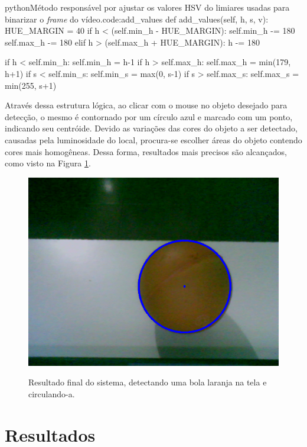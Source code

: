 \begin{figure}[H]
\end{figure}

\begin{code}{python}{Método responsável por ajustar os valores HSV do limiares usadas para binarizar o \textit{frame} do vídeo.}{code:add_values}
def add_values(self, h, s, v):
	HUE_MARGIN = 40
	if h < (self.min_h - HUE_MARGIN):
		self.min_h -= 180
		self.max_h -= 180
	elif h > (self.max_h + HUE_MARGIN):
        h -= 180

	if h < self.min_h:
		self.min_h = h-1
	if h > self.max_h:
		self.max_h = min(179, h+1)
	if s < self.min_s:
		self.min_s = max(0, s-1)
	if s > self.max_s:
		self.max_s = min(255, s+1)
\end{code}

Através dessa estrutura lógica, ao clicar com o mouse no objeto desejado para detecção, o mesmo é contornado por um círculo azul e marcado com um ponto, indicando seu centróide. Devido as variações das cores do objeto a ser detectado, causadas pela luminosidade do local, procura-se escolher áreas do objeto contendo cores mais homogêneas. Dessa forma, resultados mais precisos são alcançados, como visto na Figura \ref{img:cam_final}.

\begin{figure}[H]
    \centering
    {\includegraphics[scale=0.25]{figuras/cam_final}}
    \caption{Resultado final do sistema, detectando uma bola laranja na tela e circulando-a.}
    \label{img:cam_final}
\end{figure}

\section{Resultados}

